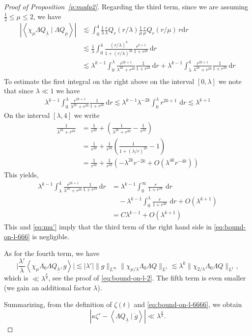 \documentclass[10pt,reqno]{amsart}
\newcommand{\la}{\lambda}
\newcommand{\ang}[1]{\left\langle{#1}\right\rangle}
\newcommand{\abs}[1]{\left\lvert{#1}\right\rvert}
\newcommand{\EQ}[1]{\begin{equation}\begin{split} #1 \end{split}\end{equation}}
\numberwithin{equation}{section}
\theoremstyle{remark}
\newcommand{\dr}{\, \mathrm{d}r}
\newcommand{\ula}{\underline{\lambda}}
\newcommand{\umu}{\underline{\mu}}
\newcommand{\ud}{\mathrm{d}}
\newcommand{\0}{\emptyset}
\begin{document}
\begin{proof}[Proof of Proposition~\ref{p:modp2}]
Regarding the third term,
 since we are assuming  $\frac 12 \le  \mu \leq 2$, we have 
  \EQ{
  \abs{\ang{\chi_\mu \Lambda Q_{\ula}\mid \Lambda Q_{\umu}}}& \lesssim \int_0^4 \frac{1}{\la} \frac{r}{\la} Q_r(r/ \la) \frac{1}{\mu} \frac{r}{\mu}  Q_{r}(r/ \mu) \, r \ud r \\
  & \lesssim \frac{1}{\la} \int_0^4  \frac{ (r/ \la)^{k}}{ 1+ (r/\la)^{2k}} \frac{r^{k+1}}{ 1+ r^{2k}} \, \ud r \\
  & \lesssim \la^{k-1} \int_0^\la  \frac{ r^{2k+1}}{ \la^{2k} + r^{2k}} \frac{1}{ 1+ r^{2k}} \, \ud r  +  \la^{k-1} \int_\la^4  \frac{ r^{2k+1}}{ \la^{2k} + r^{2k}} \frac{1}{ 1+ r^{2k}} \, \ud r\\
  }
  To estimate the first integral on the right above on the interval $[0, \la]$ we note that since $\la \ll 1$ we have 
  \EQ{
   \la^{k-1} \int_0^\la  \frac{ r^{2k+1}}{ \la^{2k} + r^{2k}} \frac{1}{ 1+ r^{2k}} \, \ud r \lesssim \la^{k-1}  \la^{-2k} \int_0^\la r^{2k+1} \,  \dr \lesssim \la^{k+1} 
  }
  On the interval $[\la, 4]$ we write 
  \EQ{
  \frac{1}{\la^{2k} + r^{2k}}  &= \frac{1}{r^{2k}} +  \left( \frac{1}{\la^{2k} + r^{2k}}  - \frac{1}{r^{2k}} \right) \\
  & =  \frac{1}{r^{2k}} +  \frac{1}{r^{2k}} \left( \frac{1}{1 + (\la/r)^{2k} }  - 1\right)  \\ 
  &= \frac{1}{r^{2k}} + \frac{1}{r^{2k}} \left( -\la^{2k}r^{-2k}   + O( \la^{4k}r^{-4k})\right)
  }
  This yields, 
  \EQ{
  \la^{k-1} \int_\la^4  \frac{ r^{2k+1}}{ \la^{2k} + r^{2k}} \frac{1}{ 1+ r^{2k}} \, \ud r & =   \la^{k-1} \int_0^{\infty} \frac{r}{1+ r^{2k}} \, \dr \\
  & \quad  - \la^{k-1}\int_0^\la   \frac{r}{1+ r^{2k}} \, \dr + O( \la^{k+1}) \\
    & = C \la^{k-1} + O( \la^{k+1})
  }  
 This and \eqref{eq:mu'} imply that the third term of the right hand side in \eqref{eq:bound-on-l-666}
 is negligible.

As for the fourth term, we have
\begin{equation}
\Big|\frac{\lambda'}{\lambda}\ang{\chi_\mu \Lambda_0\Lambda Q_{\ula}, g}\Big| \lesssim |\lambda'|\|g\|_{L^\infty}\|\chi_{\mu/\lambda}\Lambda_0\Lambda Q\|_{L^1} \lesssim \lambda^k\|\chi_{2/\lambda}\Lambda_0\Lambda Q\|_{L^1},
\end{equation}
which is $\ll \lambda^\frac k2$, see the proof of \eqref{eq:bound-on-l-2}.
The fifth term is even smaller (we gain an additional factor $\lambda$).

Summarizing, from the definition of $\zeta(t)$ and \eqref{eq:bound-on-l-6666}, we obtain
\begin{equation}
\label{eq:bound-on-l-6666}
|\kappa\zeta' - \ang{\Lambda Q_{\ula}\mid \dot g}| \ll \lambda^\frac k2.
\end{equation}


\end{proof}
\end{document}

